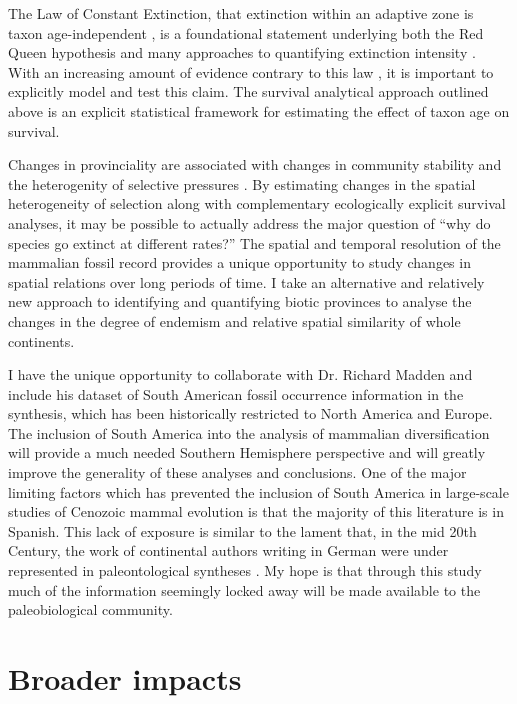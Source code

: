\documentclass[11pt,letterpaper]{article}
\begin{document}
The Law of Constant Extinction, that extinction within an adaptive zone is taxon age-independent \citep{VanValen1973}, is a foundational statement underlying both the Red Queen hypothesis and many approaches to quantifying extinction intensity \citep{Alroy2014a,Foote1996e,Foote1997c,Foote2000,Raup1975,Sepkoski1975}. With an increasing amount of evidence contrary to this law \citep{Drake2014,Raup1975,Sepkoski1975,Finnegan2008}, it is important to explicitly model and test this claim. The survival analytical approach outlined above is an explicit statistical framework for estimating the effect of taxon age on survival.

Changes in provinciality are associated with changes in community stability and the heterogenity of selective pressures \citep{Sidor2013,Vilhena2013}. By estimating changes in the spatial heterogeneity of selection along with complementary ecologically explicit survival analyses, it may be possible to actually address the major question of ``why do species go extinct at different rates?'' The spatial and temporal resolution of the mammalian fossil record provides a unique opportunity to study changes in spatial relations over long periods of time. I take an alternative and relatively new approach to identifying and quantifying biotic provinces \citep{Sidor2013,Vilhena2013b,Vilhena2013} to analyse the changes in the degree of endemism and relative spatial similarity of whole continents. 

I have the unique opportunity to collaborate with Dr. Richard Madden and include his dataset of South American fossil occurrence information in the synthesis, which has been historically restricted to North America and Europe. The inclusion of South America into the analysis of mammalian diversification will provide a much needed Southern Hemisphere perspective and will greatly improve the generality of these analyses and conclusions. One of the major limiting factors which has prevented the inclusion of South America in large-scale studies of Cenozoic mammal evolution is that the majority of this literature is in Spanish. This lack of exposure is similar to the lament that, in the mid 20th Century, the work of continental authors writing in German were under represented in paleontological syntheses \citep{Gould1979a}. My hope is that through this study much of the information seemingly locked away will be made available to the paleobiological community.


\section{Broader impacts}
\end{document}
